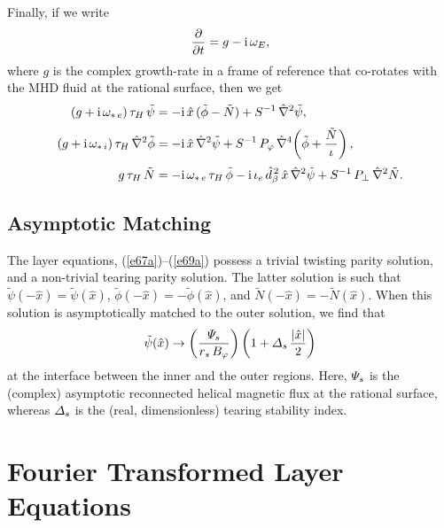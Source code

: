 \documentclass[12pt,prb,aps,notitlepage]{revtex4-1}
\begin{document}
Finally, if we write
\begin{equation}
\frac{\partial}{\partial t} = g-{\rm i}\,\omega_E,
\end{equation}
where $g$ is the complex growth-rate in a frame of reference that co-rotates with the MHD fluid at the rational
surface, then we get 
\begin{align}\label{e67a}
(g+{\rm i}\,\omega_{\ast\,e})\,\tau_H\,\tilde{\psi} &= -{\rm i} \,\hat{x}\,(\tilde{\phi}-\tilde{N})+ S^{-1}\,\hat{\nabla}^2\tilde{\psi},\\[0.5ex]
(g+{\rm i}\,\omega_{\ast\,i})\,\tau_H\,\hat{\nabla}^2\tilde{\phi} &= -{\rm i}\,\hat{x}\,\hat{\nabla}^2\tilde{\psi}+S^{-1}\,P_\varphi\,\hat{\nabla}^4\!\left(\tilde{\phi} + \frac{\tilde{N}}{\iota}\right),\\[0.5ex]
g\,\tau_H\,\tilde{N} &= -{\rm i}\,\omega_{\ast\,e}\,\tau_H\,\tilde{\phi} - {\rm i}\,\iota_e\,\hat{d}_\beta^{\,2}\,\hat{x}\,\hat{\nabla}^2\tilde{\psi}+ S^{-1}\,P_\perp\,\hat{\nabla}^2 \tilde{N}.\label{e69a}
\end{align}

\subsection{Asymptotic Matching}
The  layer equations, (\ref{e67a})--(\ref{e69a}) possess a trivial twisting parity solution, and a non-trivial tearing parity solution.\cite{twist} 
The latter solution is such that 
$\tilde{\psi}(-\hat{x})=\tilde{\psi}(\hat{x})$, $\tilde{\phi}(-\hat{x})=-\tilde{\phi}(\hat{x})$, and $\tilde{N}(-\hat{x})=
-\tilde{N}(\hat{x})$. When this solution is asymptotically matched to the outer solution, we find that
\begin{equation}\label{e79}
\tilde{\psi}(\hat{x})\rightarrow \left(\frac{{\mit\Psi}_s}{r_s\,B_\varphi}\right)\left(1+{\mit\Delta}_s\,\frac{|\hat{x}|}{2}\right)
\end{equation}
at the interface between the inner and the outer regions. Here, ${\mit\Psi}_s$ is the (complex) asymptotic reconnected helical magnetic flux at the rational surface,
whereas ${\mit\Delta}_s$ is the (real, dimensionless) tearing stability index.

\section{Fourier Transformed Layer Equations}
\end{document}

